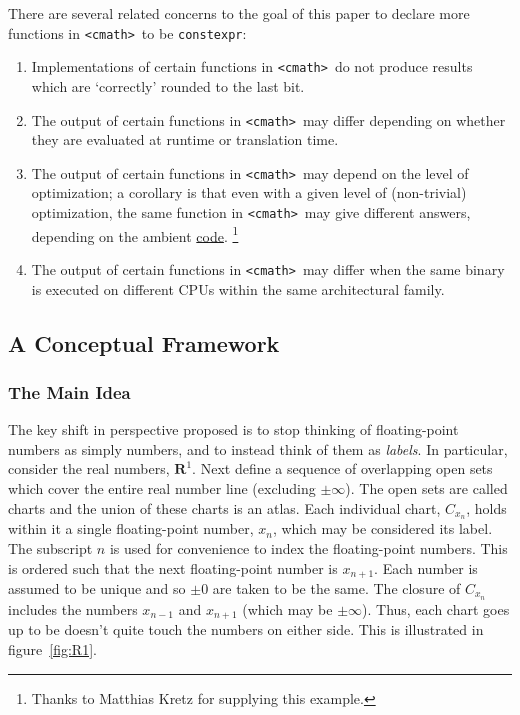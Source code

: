 \documentclass[prd,twocolumn,amsmath,amssymb,nofootinbib,eqsecnum]{revtex4-1}
\newcommand{\constexpr}{\code{constexpr}\xspace}
\newcommand{\code}[1]{{\tt #1}}
\newcommand{\header}[1]{{\tt <#1>}}
\newcommand{\cmath}{\header{cmath}}
\newcommand{\fig}[1]{figure~\ref{fig:#1}}
\begin{document}
There are several related concerns to the goal of this paper to declare more functions in \cmath\ to be \constexpr:
\begin{enumerate}
	\item Implementations of certain functions in \cmath\ do not produce results which are `correctly' rounded to the last bit.
	
	\item The output of certain functions in \cmath\ may differ depending on whether they are evaluated at runtime or translation time.
	
	\item The output of certain functions in \cmath\ may depend on the level of optimization; a corollary
	is that even with a given level of (non-trivial) optimization, the same function in \cmath\ may give 
	different answers, depending on the ambient \href{https://godbolt.org/z/js7rGvPbf}{code}.%
	\footnote{Thanks to Matthias Kretz for supplying this example.}
	
	\item The output of certain functions in \cmath\ may differ when the same binary is executed on
	different CPUs within the same architectural family.
\end{enumerate}

\subsection{A Conceptual Framework}

\subsubsection{The Main Idea}

The key shift in perspective proposed is to stop thinking of floating-point numbers as simply numbers, and to instead think of them as {\it labels}. In particular, consider the real numbers, $\mathbf{R}^1$. Next define a sequence of overlapping open sets which cover the entire real number line (excluding $\pm \infty$). The open sets are called charts and the union of these charts is an atlas. Each individual chart, $C_{x_n}$, holds within it a single floating-point number, $x_n$, which may be considered its label. The subscript $n$ is used for convenience to index the floating-point numbers. This is ordered such that the next floating-point number is $x_{n+1}$. Each number is assumed to be unique and so $\pm 0$ are taken to be the same. The closure of 
$C_{x_n}$ includes the numbers $x_{n-1}$ and $x_{n+1}$ (which may be $\pm \infty$). Thus, each chart goes up to be doesn't quite touch the numbers on either side. This is illustrated in \fig{R1}.
\end{document}
